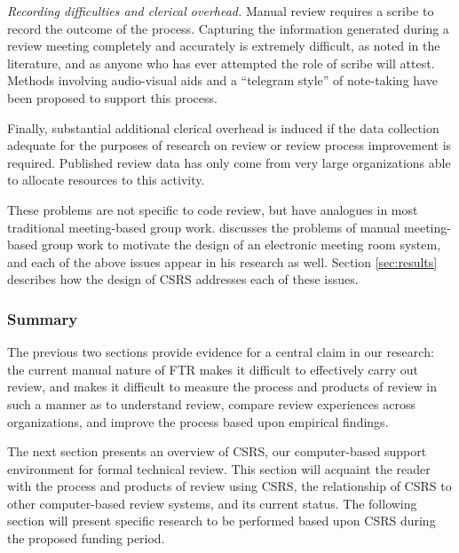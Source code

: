 \begin{itemizenoindent}
\item {\em Recording difficulties and clerical overhead.} Manual review
  requires a scribe to record the outcome of the process.  Capturing the
  information generated during a review meeting completely and accurately is
  extremely difficult, as noted in the literature, and as anyone who has ever
  attempted the role of scribe will attest. Methods involving audio-visual
  aids and a ``telegram style'' of note-taking have been proposed to support
  this process.
  
  Finally, substantial additional clerical overhead is induced if the data
  collection adequate for the purposes of research on review or review
  process improvement is required.  Published review data has only come
  from very large organizations able to allocate resources to this activity.

\end{itemizenoindent}

These problems are not specific to code review, but have analogues in most
traditional meeting-based group work.  \cite{Nunamaker91} discusses the
problems of manual meeting-based group work to motivate the design of an
electronic meeting room system, and each of the above issues appear in his
research as well. Section \ref{sec:results} describes how the design
of CSRS addresses each of these issues. 



\subsubsection{Summary}

The previous two sections provide evidence for a central claim in our
research: the current manual nature of FTR makes it difficult to
effectively carry out review, and makes it difficult to measure the process
and products of review in such a manner as to understand review, compare
review experiences across organizations, and improve the process based upon
empirical findings.

The next section presents an overview of CSRS, our computer-based support
environment for formal technical review.  This section will acquaint the
reader with the process and products of review using CSRS, the relationship
of CSRS to other computer-based review systems, and its current status. The
following section will present specific research to be performed based upon
CSRS during the proposed funding period.





